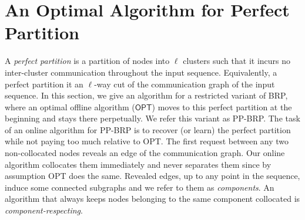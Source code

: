 \documentclass[manuscript,screen=true]{acmart}
\newcommand{\OPT}{\textsf{OPT}\xspace}
\newcommand{\OBRP}{BRP}
\newcommand{\PPOBRP}{PP-BRP}
\newcommand\mahmoud[1]{\color{green}\textbf{\\ Mahmoud: #1}\\\color{black}}
\newcommand\maciek[1]{\color{brown}\textbf{\\ Maciek: #1}\color{black}}
\begin{document}
\section{An Optimal Algorithm for Perfect Partition}	\label{sec:ppl}


A \emph{perfect partition} is a partition of nodes into $\ell$ clusters
such that it incurs no inter-cluster communication throughout the input sequence.
Equivalently, a perfect partition it an $\ell$-way cut of the communication graph of the input sequence.
In this section,
we give an algorithm for a restricted variant of  \OBRP{},
where an optimal offline algorithm ($\OPT$) moves to this perfect partition
at the beginning and stays there perpetually.
We refer this variant as \PPOBRP{}.
The task of an online algorithm for \PPOBRP{} is to recover (or learn) the perfect partition while not paying too much relative to \OPT.
%
The first request between any two non-collocated nodes reveals an edge of the communication graph.
Our online algorithm collocates them immediately and never separates them since by assumption \OPT does the same.
Revealed edges, up to any point in the sequence,
induce some connected subgraphs and we refer to them as \emph{components}.
An algorithm that always  keeps nodes belonging to the same component collocated is \emph{component-respecting}.
\end{document}
